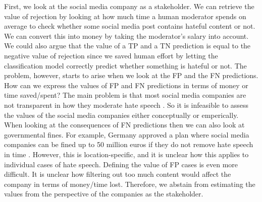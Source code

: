 First, we look at the social media company as a stakeholder.
%
We can retrieve the value of rejection by looking at how much time a human moderator spends on average to check whether some social media post contains hateful content or not.
%
We can convert this into money by taking the moderator's salary into account.
%
We could also argue that the value of a TP and a TN prediction is equal to the negative value of rejection since we saved human effort by letting the classification model correctly predict whether something is hateful or not.
%
The problem, however, starts to arise when we look at the FP and the FN predictions.
%
How can we express the values of FP and FN predictions in terms of money or time saved/spent?
%
The main problem is that most social media companies are not transparent in how they moderate hate speech \citep{klonick2017new}.
%
So it is infeasible to assess the values of the social media companies either conceptually or emperically.
%
When looking at the consequences of FN predictions then we can also look at governmental fines.
%
For example, Germany approved a plan where social media companies can be fined up to 50 million euros if they do not remove hate speech in time \citep{bbc-firms-face-fine-germany}.
%
However, this is location-specific, and it is unclear how this applies to individual cases of hate speech.
%
Defining the value of FP cases is even more difficult.
%
It is unclear how filtering out too much content would affect the company in terms of money/time lost.
%
Therefore, we abstain from estimating the values from the perspective of the companies as the stakeholder.

